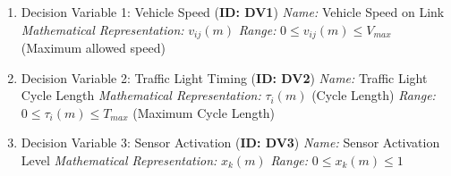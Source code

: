 \documentclass{article}
\begin{document}
\begin{enumerate}[label=\arabic*.]
    \item Decision Variable 1: Vehicle Speed (\textbf{ID: DV1})
        \textit{Name:} Vehicle Speed on Link
        \textit{Mathematical Representation:} $v_{ij}(m)$
        \textit{Range:} $0 \le v_{ij}(m) \le V_{max}$ (Maximum allowed speed)

    \item Decision Variable 2: Traffic Light Timing (\textbf{ID: DV2})
        \textit{Name:} Traffic Light Cycle Length
        \textit{Mathematical Representation:} $\tau_{i}(m)$ (Cycle Length)
        \textit{Range:} $0 \le \tau_{i}(m) \le T_{max}$ (Maximum Cycle Length)

    \item Decision Variable 3:  Sensor Activation (\textbf{ID: DV3})
        \textit{Name:} Sensor Activation Level
        \textit{Mathematical Representation:}  $x_k(m)$
        \textit{Range:}  $0 \le x_k(m) \le 1$
\end{enumerate}
\end{document}
